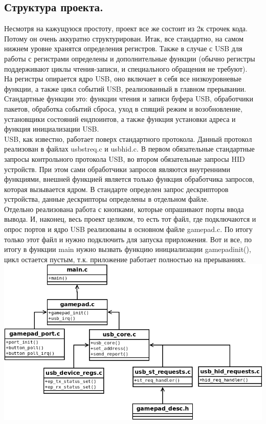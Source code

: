 \documentclass[12pt,a4paper]{article}
\begin{document}
\subsection{Структура проекта.}
    Несмотря на кажущуюся простоту, проект все же состоит из 2к строчек кода.
    Потому он очень аккуратно структурирован. Итак, все стандартно, на самом
    нижнем уровне хранятся определения регистров. Также в случае с USB для
    работы с регистрами определены и дополнительные функции (обычно регистры
    поддерживают циклы чтения-записи, и специального обращения не требуют).\\
    На регистры опирается ядро USB,
    оно включает в себя все низкоуровневые функции, а также цикл событий USB,
    реализованный в главном прерывании. Стандартные функции это: функции чтения
    и записи буфера USB, обработчики пакетов, обработка событий сброса, уход в
    спящий режим и возобновление, установщики состояний ендпоинтов, а также
    функция установки адреса и функция инициализации USB.\\
    USB, как известно, работает поверх
    стандартного протокола. Данный протокол реализован в файлах usb\textunderscore st\textunderscore req.c и
    usb\textunderscore hid.c. В первом обязательные стандартные запросы
    контрольного протокола USB, во втором обязательные запросы HID устройств.
     При этом сами обработчики запросов являются внутренними
    функциями, внешней функцией является только функция обработчика запросов,
    которая вызывается ядром. В стандарте определен запрос дескрипторов
    устройства, данные дескрипторы определены в отдельном файле.\\
    Отдельно реализована работа с
    кнопками, которые опрашивают порты ввода вывода. И, наконец, весь проект
    целиком, то есть тот файл, где подключаются и опрос портов и ядро USB
    реализованы в основном файле gamepad.c. По итогу только этот файл и нужно
    подключить для запуска прирложения. Вот и все, по итогу в функции main
    нужно вызвать функцию инициализации gamepad\textunderscore init(), цикл остается пустым,
    т.к. приложение работает полностью на прерываниях.\\
\includegraphics[width=15cm]{proj.png}\\
\end{document}
